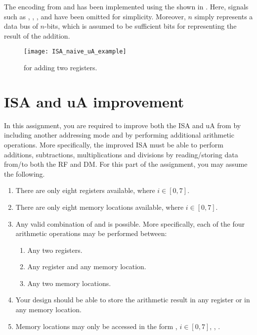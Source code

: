 \documentclass[number=03]{assignment}
\begin{document}
The encoding from  and  has been implemented using the \uA shown in  . 
Here, signals such as , , ,  and  have been omitted for simplicity. 
Moreover, $n$ simply represents a data bus of $n$-bits, which is assumed to be sufficient bits for representing the result of the addition.
 \begin{figure}[!htb]
  \centering
  \texttt{[image: ISA\_naive\_uA\_example]}
  \caption{\uA for adding two registers.}
  \label{Figure:NaiveuA}
\end{figure} 

\newpage
\section{\ac{ISA} and \ac{uA} improvement}\label{Sec:ISA_Improvement}
In this assignment, you are required to improve both the \ac{ISA} and \ac{uA} from  by including another addressing mode and by performing additional arithmetic operations.
More specifically, the improved \ac{ISA} must be able to perform additions, subtractions, multiplications and divisions by reading/storing data from/to both the \ac{RF} and \ac{DM}.
For this part of the assignment, you may assume the following.
\begin{enumerate} 
  \item There are only eight registers  available, where $i\in[0,7]$.\label{item:1} 
  \item There are only eight memory locations  available, where $i\in[0,7]$.\label{item:2}
  \item Any valid combination of  and  is possible.\label{item:3}
  More specifically, each of the four arithmetic operations may be performed between:
  \begin{enumerate}
  \item Any two registers.
  \item Any register and any memory location.
  \item Any two memory locations.
  \end{enumerate}  
   \item Your design should be able to store the arithmetic result in any register or in any memory location.\label{item:4}
   \item Memory locations may only be accessed in the form , $i \in [0,7]$, \ie, .\label{item:5}
\end{enumerate}
\end{document}
